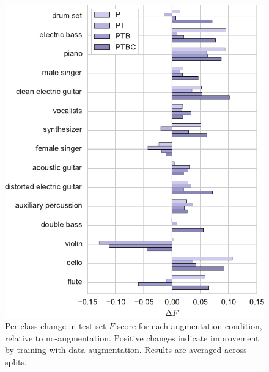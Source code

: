 \documentclass{article}
\begin{document}


\begin{figure}
    \centering
    \includegraphics[width=\columnwidth]{figs/fscore-improvement}
    \caption{Per-class change in test-set $F$-score for each augmentation condition,
        relative to no-augmentation.  
        Positive changes indicate improvement by training with data augmentation.
        Results are averaged across splits.\label{fscore}}
\end{figure}
\end{document}
